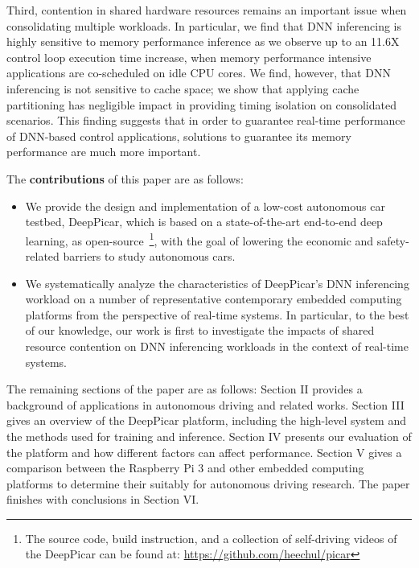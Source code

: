 Third, contention in shared hardware resources remains an important
issue when consolidating multiple workloads. 
In particular, we find that DNN inferencing is highly sensitive to
memory performance inference as we observe up to an 11.6X control loop
execution time increase, when memory performance intensive
applications are co-scheduled on idle CPU cores.
We find, however, that DNN inferencing is not sensitive to cache
space; we show that applying cache partitioning has negligible impact
in providing timing isolation on consolidated scenarios. This finding
suggests that in order to guarantee real-time performance of DNN-based
control applications, solutions to guarantee its memory performance
are much more important.

The {\bf contributions} of this paper are as follows:
\begin{itemize}
  \item We provide the design and implementation of a low-cost
    autonomous car testbed, DeepPicar, which is based on a
    state-of-the-art end-to-end deep learning, as
    open-source~\footnote{The source code, build 
instruction, and a collection of self-driving videos of the DeepPicar
can be found at: \url{https://github.com/heechul/picar}}, with the
    goal of lowering the economic and safety-related barriers to study
    autonomous cars.

  \item We systematically analyze the characteristics of DeepPicar's
    DNN inferencing workload on a number of representative
    contemporary embedded computing platforms from the perspective of
    real-time systems. In particular, to the best of our knowledge,
    our work is first to investigate the impacts of shared resource
    contention on DNN inferencing workloads in the context of
    real-time systems.

\end{itemize}

The remaining sections of the paper are as follows: Section II 
provides a background of applications in autonomous driving and related works.
 Section III gives an overview of the DeepPicar platform, including the 
high-level system and the methods used for training and inference. 
Section IV presents our evaluation of the platform and how different 
factors can affect performance. Section V gives a comparison between 
the Raspberry Pi 3 and other embedded computing platforms to 
determine their suitably for autonomous driving research. The paper finishes with 
conclusions in Section VI.
